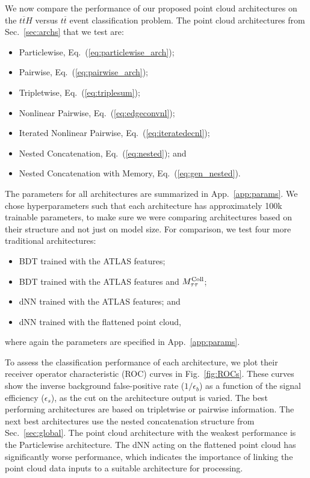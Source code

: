 \documentclass[aps,prd,twocolumn,superscriptaddress,floatfix,longbibliography,preprintnumbers,nofootinbib]{revtex4-1} %
\DeclareRobustCommand{\Sec}[1]{Sec.~\ref{sec:#1}}
\DeclareRobustCommand{\App}[1]{App.~\ref{app:#1}}
\DeclareRobustCommand{\Fig}[1]{Fig.~\ref{fig:#1}}
\DeclareRobustCommand{\Eq}[1]{Eq.~(\ref{eq:#1})}
\newcounter{para}
\begin{document}
We now compare the performance of our proposed point cloud architectures on the $t\overline{t}H$ versus $t\overline{t}$ event classification problem.
%
The point cloud architectures from \Sec{archs} that we test are:
%
\begin{itemize}
  \item Particlewise, \Eq{particlewise_arch};
  \item Pairwise, \Eq{pairwise_arch};
  \item Tripletwise, \Eq{triplesum};
  \item Nonlinear Pairwise, \Eq{edgeconvnl};
  \item Iterated Nonlinear Pairwise, \Eq{iteratedecnl};
  \item Nested Concatenation, \Eq{nested}; and
  \item Nested Concatenation with Memory, \Eq{gen_nested}.
\end{itemize}
%
The parameters for all architectures are summarized in \App{params}.
%
We chose hyperparameters such that each architecture has approximately 100k trainable parameters, to make sure we were comparing architectures based on their structure and not just on model size.
%
For comparison, we test four more traditional architectures:
%
 \begin{itemize}
  \item BDT trained with the ATLAS features;
  \item BDT trained with the ATLAS features and $M^{\rm Coll}_{\tau\tau}$;
  \item dNN trained with the ATLAS features; and
  \item dNN trained with the flattened point cloud,
\end{itemize}
%
where again the parameters are specified in \App{params}.


To assess the classification performance of each architecture, we plot their receiver operator characteristic (ROC) curves in \Fig{ROCs}.
%
These curves show the inverse background false-positive rate ($1/\epsilon_b$) as a function of the signal efficiency ($\epsilon_s$), as the cut on the architecture output is varied.
%
The best performing architectures are based on tripletwise or pairwise information.
%
The next best architectures use the nested concatenation structure from \Sec{global}.
%
The point cloud architecture with the weakest performance is the Particlewise architecture.%
%
The dNN acting on the flattened point cloud has significantly worse performance, which indicates the importance of linking the point cloud data inputs to a suitable architecture for processing.
\end{document}
